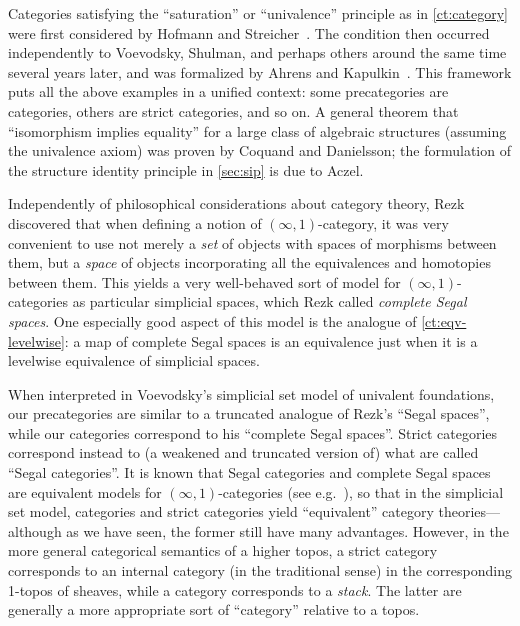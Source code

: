 Categories satisfying the ``saturation'' or ``univalence'' principle as in \cref{ct:category} were first considered by Hofmann and Streicher~\cite{hs:gpd-typethy}.
The condition then occurred independently to Voevodsky, Shulman, and perhaps others around the same time several years later, and was formalized by Ahrens and Kapulkin~\cite{aks:rezk}.
This framework puts all the above examples in a unified context: some precategories are categories, others are strict categories, and so on.
A general theorem that ``isomorphism implies equality'' for a large class of algebraic structures (assuming the univalence axiom) was proven by Coquand and Danielsson; the formulation of the structure identity principle in \cref{sec:sip} is due to Aczel.

Independently of philosophical considerations about category theory, Rezk~\cite{rezk01css} discovered that when defining a notion of $(\infty,1)$-cat\-e\-go\-ry,
%
it was very convenient to use not merely a \emph{set} of objects with spaces of morphisms between them, but a \emph{space} of objects incorporating all the equivalences and homotopies between them.
This yields a very well-behaved sort of model for $(\infty,1)$-categories as particular simplicial spaces, which Rezk called \emph{complete Segal spaces}.
%
%
One especially good aspect of this model is the analogue of \cref{ct:eqv-levelwise}: a map of complete Segal spaces is an equivalence just when it is a levelwise equivalence of simplicial spaces.

When interpreted in Voevodsky's simplicial set model of univalent foundations, our precategories are similar to a truncated analogue of Rezk's ``Segal spaces'', while our categories correspond to his ``complete Segal spaces''.
%
Strict categories correspond instead to (a weakened and truncated version of) what are called ``Segal categories''.
It is known that Segal categories and complete Segal spaces are equivalent models for $(\infty,1)$-categories (see e.g.~\cite{bergner:infty-one}), so that in the simplicial set model, categories and strict categories yield ``equivalent'' category theories---although as we have seen, the former still have many advantages.
However, in the more general categorical semantics of a higher topos,
%
a strict category corresponds to an internal category (in the traditional sense) in the corresponding 1-topos of sheaves, while a category corresponds to a \emph{stack}.
%
The latter are generally a more appropriate sort of ``category'' relative to a topos.

